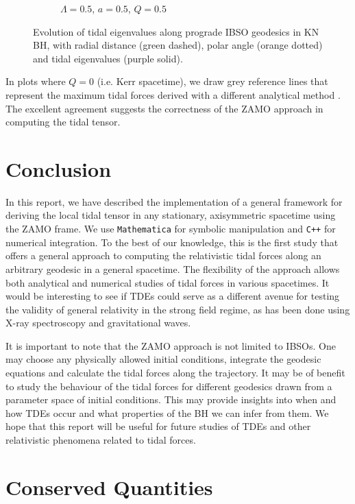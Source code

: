 \documentclass[11pt, twocolumn]{article}
\begin{document}
\begin{figure}[ht!]
\begin{subfigure}[b]{\columnwidth}
        \caption{$\Lambda = 0.5$, $a = 0.5$, $Q = 0.5$}
    \end{subfigure}
    \caption{Evolution of tidal eigenvalues along prograde IBSO geodesics in KN BH, with radial distance (green dashed), polar angle (orange dotted) and tidal eigenvalues (purple solid).}
    \label{fig:kn_simulations}
\end{figure}

In plots where $Q = 0$ (i.e. Kerr spacetime), we draw grey reference lines that represent the maximum tidal forces derived with a different analytical method \cite{Marck1983}. The excellent agreement suggests the correctness of the ZAMO approach in computing the tidal tensor.


\section{Conclusion} \label{sec:conclusion}


In this report, we have described the implementation of a general framework for deriving the local tidal tensor in any stationary, axisymmetric spacetime using the ZAMO frame. We use \texttt{Mathematica} for symbolic manipulation and \texttt{C++} for numerical integration. To the best of our knowledge, this is the first study that offers a general approach to computing the relativistic tidal forces along an arbitrary geodesic in a general spacetime. The flexibility of the approach allows both analytical and numerical studies of tidal forces in various spacetimes. It would be interesting to see if TDEs could serve as a different avenue for testing the validity of general relativity in the strong field regime, as has been done using X-ray spectroscopy and gravitational waves.

It is important to note that the ZAMO approach is not limited to IBSOs. One may choose any physically allowed initial conditions, integrate the geodesic equations and calculate the tidal forces along the trajectory. It may be of benefit to study the behaviour of the tidal forces for different geodesics drawn from a parameter space of initial conditions. This may provide insights into when and how TDEs occur and what properties of the BH we can infer from them. We hope that this report will be useful for future studies of TDEs and other relativistic phenomena related to tidal forces.

\printbibliography


\appendix
\section{Conserved Quantities} \label{app:conserved}
\end{document}
